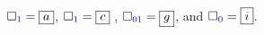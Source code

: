 $\square_{\textcolor{blue}{1}} = \boxed{a}$, $\square_{\textcolor{blue}{1}} = \boxed{c}$ , $\square_{\textcolor{blue}{01}} = \boxed{g}$, and $\square_{\textcolor{blue}{0}} = \boxed{i}$.



\def\macrofilledtile{
\draw [fill=lightgray,opacity=0.99]  (\x + 0, \y) rectangle (\x+1,\y+1);
}
\def\macropositivetile{
     \def\south{}
     \def\east{}
     \def\north{}
     \def\west{} 
     \draw (\x + 0, \y) --  (\x+1,\y) node [pos=0.5,above] {\south} -- (\x+1,\y+1) node [pos=0.5,left] {\east} -- (\x+0,\y+1) node [pos=0.5,above] {\north} --  (\x + 0, \y)  node [pos=0.5,left] {\west};
}
\def\macronegativetile{
     \def\south{}
     \def\east{}
     \def\north{}
     \def\west{} 
     \draw (\x + 0, \y) --  (\x+1,\y) node [pos=0.5,above] {\south} -- (\x+1,\y+1) node [pos=0.5,left] {\east} -- (\x+0,\y+1) node [pos=0.5,above] {\north} --  (\x + 0, \y)  node [pos=0.5,left] {\west};
}
\def\matchingcolor{2pt}
